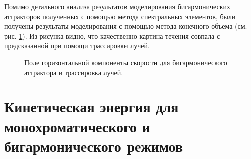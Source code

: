Помимо детального анализа результатов моделирования бигармонических аттракторов полученных с помощью метода спектральных элементов, были получены результаты моделирования с помощью метода конечного объема (см. рис. \ref{fig:biharm}). Из рисунка видно, что качественно картина течения совпала с предсказанной при помощи трассировки лучей. 

\begin{figure}
    \centering
    \caption{Поле горизонтальной компоненты скорости для бигармонического аттрактора и трассировка лучей.}
    \label{fig:biharm}
\end{figure}


\section{Кинетическая энергия для монохроматического и бигармонического режимов}

